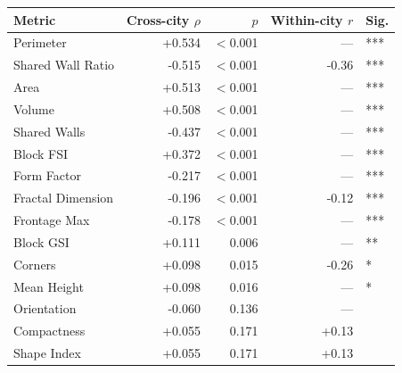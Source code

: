 \begin{tabular}{@{}lrrrl@{}}
  \toprule
  \textbf{Metric} & \textbf{Cross-city $\rho$} & \textbf{$p$} & \textbf{Within-city $r$} & \textbf{Sig.} \\
  \midrule
  Perimeter & +0.534 & $<$0.001 & --- & *** \\
  Shared Wall Ratio & -0.515 & $<$0.001 & -0.36 & *** \\
  Area & +0.513 & $<$0.001 & --- & *** \\
  Volume & +0.508 & $<$0.001 & --- & *** \\
  Shared Walls & -0.437 & $<$0.001 & --- & *** \\
  Block FSI & +0.372 & $<$0.001 & --- & *** \\
  Form Factor & -0.217 & $<$0.001 & --- & *** \\
  Fractal Dimension & -0.196 & $<$0.001 & -0.12 & *** \\
  Frontage Max & -0.178 & $<$0.001 & --- & *** \\
  Block GSI & +0.111 & 0.006 & --- & ** \\
  Corners & +0.098 & 0.015 & -0.26 & * \\
  Mean Height & +0.098 & 0.016 & --- & * \\
  Orientation & -0.060 & 0.136 & --- &  \\
  Compactness & +0.055 & 0.171 & +0.13 &  \\
  Shape Index & +0.055 & 0.171 & +0.13 &  \\
  \bottomrule
\end{tabular}